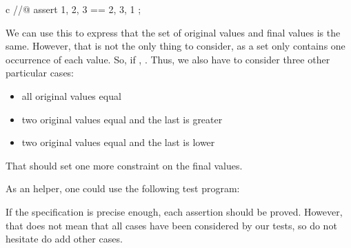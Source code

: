 \begin{CodeBlock}{c}
//@ assert { 1, 2, 3 } == { 2, 3, 1 };
\end{CodeBlock}


We can use this to express that the set of original values and final values
is the same. However, that is not the only thing to consider, as a set only
contains one occurrence of each value. So, if ,
. Thus, we also have to consider three
other particular cases:


\begin{itemize}
\item all original values equal
\item two original values equal and the last is greater
\item two original values equal and the last is lower
\end{itemize}


That should set one more constraint on the final values.


As an helper, one could use the following test program:




If the specification is precise enough, each assertion should be proved.
However, that does not mean that all cases have been considered by our tests,
so do not hesitate do add other cases.
